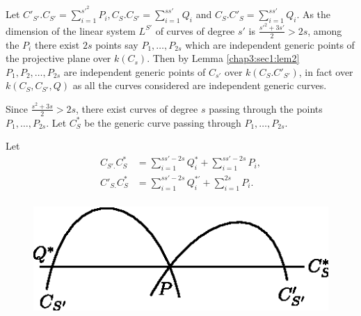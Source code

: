 Let $C'_{S'} . C_{S'}  = \sum\limits^{s'^2}_{i=1} P_i, C_S . C_{S'} =
\sum\limits^{ss'}_{i=1} Q_i $ 
and $C_{S}. C'_{S} = \sum\limits^{ss'}_{i=1} Q_i$. As the dimension of
the linear system $L^{S'} $ of curves of degree $s'$ is $
\frac{s'^{2}+3s'}{2} > 2s$, among the $P_{i} $ there\pageoriginale
exist $2s$ points say $P_{1}, \ldots , P_{2s} $ which are independent
generic points of the projective plane over $k(C_{s})$. Then by
Lemma \ref{chap3:sec1:lem2} $P_{1}, P_{2}, \ldots , P_{2s}$ are independent generic
points of $ C_{s'}$ over $ k(C_{S}. C'_{S'})$, in fact over $
k(C_{S}, C_{S'}, Q)$ as all the curves considered are independent
generic curves. 
 
 Since $\frac{s^{2}+ 3s}{2} >  2s$, there exist curves of degree
 $s$ passing through the points $P_{1} , \ldots , P_{2s}$. Let $
 C^{*}_{S} $ be the generic curve passing through $P_{1}, \ldots
 ,P_{2s}$. 

\noindent  
\begin{minipage}{4.6cm}
Let 
\begin{align*}
  C_{S'.}C^{*}_{S} & = \sum\limits_{i=1}^{ss'-2s} Q^{*}_{i}+
  \sum\limits_{i=1}^{ss'-2s} P_{i},\\ 
  C'_{S.}C^{*}_{S} & = \sum\limits^{ss'-2s}_{i=1} Q^{*'}_{i}+
  \sum\limits_{i=1}^{2s} P_i. \\ 
\end{align*}
\end{minipage}\hspace{1cm}
\begin{minipage}{3.3cm}
\begin{figure}[H]
\centerline{\includegraphics[scale=.8]{vol31-figures/fig31-2.eps}}
\end{figure}
\end{minipage}

